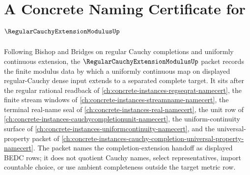\chapter{A Concrete Naming Certificate for $\RegularCauchyExtensionModulusUp$}
\label{ch:concrete-instances-regular-cauchy-extension-modulus-namecert}

Following Bishop and Bridges on regular Cauchy completions and uniformly continuous extension, the $\RegularCauchyExtensionModulusUp$ packet records the finite modulus data by which a uniformly continuous map on displayed regular-Cauchy dense input extends to a separated complete target. It sits after the regular rational readback of \autoref{ch:concrete-instances-regseqrat-namecert}, the finite stream windows of \autoref{ch:concrete-instances-streamname-namecert}, the terminal real-name seal of \autoref{ch:concrete-instances-real-namecert}, the unit row of \autoref{ch:concrete-instances-cauchycompletionunit-namecert}, the uniform-continuity surface of \autoref{ch:concrete-instances-uniformcontinuity-namecert}, and the universal-property packet of \autoref{ch:concrete-instances-cauchy-completion-universal-property-namecert}. The packet names the completion-extension handoff as displayed BEDC rows; it does not quotient Cauchy names, select representatives, import countable choice, or use ambient completeness outside the target metric row.


